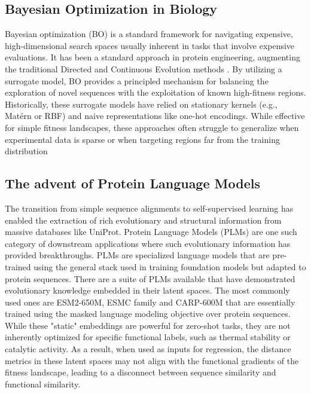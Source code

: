 \documentclass{article}
\theoremstyle{plain}
\theoremstyle{definition}
\theoremstyle{remark}
\begin{document}
\subsection{Bayesian Optimization in Biology}
Bayesian optimization (BO) is a standard framework for navigating expensive, high-dimensional search spaces usually inherent in tasks that involve expensive evaluations. It has been a standard approach in protein engineering, augmenting the traditional Directed and Continuous Evolution methods \cite{romero2013navigating}. By utilizing a surrogate model, BO provides a principled mechanism for balancing the exploration of novel sequences with the exploitation of known high-fitness regions. Historically, these surrogate models have relied on stationary kernels (e.g., Matérn or RBF) and naive representations like one-hot encodings. While effective for simple fitness landscapes, these approaches often struggle to generalize when experimental data is sparse or when targeting regions far from the training distribution

\subsection{The advent of Protein Language Models}
The transition from simple sequence alignments to self-supervised learning has enabled the extraction of rich evolutionary and structural information from massive databases like UniProt. Protein Language Models (PLMs) are one such category of downstream applications where such evolutionary information has provided breakthroughs. PLMs are specialized language models that are pre-trained using the general stack used in training foundation models but adapted to protein sequences. There are a suite of PLMs available that have demonstrated evolutionary knowledge embedded in their latent spaces. The most commonly used ones are ESM2-650M, ESMC family and CARP-600M that are essentially trained using the masked language modeling objective over protein sequences. While these "static" embeddings are powerful for zero-shot tasks, they are not inherently optimized for specific functional labels, such as thermal stability or catalytic activity. As a result, when used as inputs for regression, the distance metrics in these latent spaces may not align with the functional gradients of the fitness landscape, leading to a disconnect between sequence similarity and functional similarity.
\end{document}
